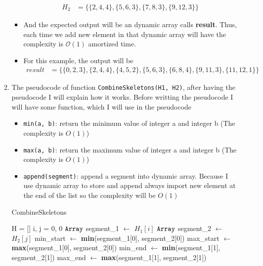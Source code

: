 \documentclass{article}
\begin{document}
\begin{enumerate}[label=({\alph*})]
\begin{enumerate}
\begin{itemize}
\begin{align}
					H_2 &= \{\{2, 4, 4\}, \{5, 6, 3\}, \{7, 8, 3\}, \{9, 12, 3\}\}
				\end{align}
				\item And the expected output will be an dynamic array calls \textbf{result}. Thus, each time we add new element in that dynamic array will have the complexity is \(\mathcal{O}(1)\) amortized time.
				\item For this example, the output will be
				\begin{align}
					result &= \{\{0, 2, 3\}, \{2, 4, 4\}, \{4, 5, 2\}, \{5,6,3\}, \{6, 8, 4\}, \{9, 11, 3\}, \{11, 12, 1\}\}
				\end{align}
			\end{itemize}
			\item The pseudocode of function \verb|CombineSkeletons(H1, H2)|, after having the pseudocode I will explain how it works. Before writting the pseudocode I will have some function, which I will use in the pseudocode
			\begin{itemize}
				\item \verb|min(a, b)|: return the minimum value of integer a and integer b (The complexity is \(O(1)\))
				\item \verb|max(a, b)|: return the maximum value of integer a and integer b (The complexity is \(O(1)\))
				\item \verb|append(segment)|: append a segment into dynamic array. Because I use dynamic array to store and append always import new element at the end of the list so the complexity will be \(O(1)\)
			\end{itemize}
			\begin{algorithm}[H]
		\caption{CombineSkeletons}
	\begin{algorithmic}[1]
		\State H = [] 
    	\State i, j = 0, 0 
			\State \(\verb|Array|\) segment\_1 \(\leftarrow\) \(H_1[i]\)
			\State \(\verb|Array|\) segment\_2 \(\leftarrow\) \(H_2[j]\) 
			 
				\State min\_start \(\leftarrow\) \textbf{min}(segment\_1[0], segment\_2[0])
				\State max\_start \(\leftarrow\) \textbf{max}(segment\_1[0], segment\_2[0])
				\State min\_end \(\leftarrow\) \textbf{min}(segment\_1[1], segment\_2[1])
				\State max\_end  \(\leftarrow\) \textbf{max}(segment\_1[1], segment\_2[1])


\end{algorithmic}
\end{algorithm}
\end{enumerate}
\end{enumerate}
\end{document}
